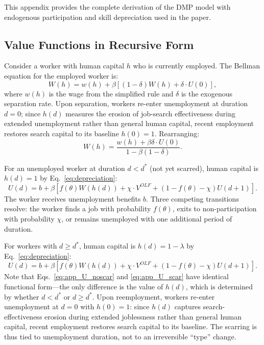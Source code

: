 \documentclass[12pt]{article}
\begin{document}
This appendix provides the complete derivation of the DMP model with endogenous participation and skill depreciation used in the paper.

\subsection{Value Functions in Recursive Form}

Consider a worker with human capital $h$ who is currently employed. The Bellman equation for the employed worker is:
\begin{equation}
W(h) = w(h) + \beta \left[ (1 - \delta) W(h) + \delta \cdot U(0) \right],
\label{eq:app_W}
\end{equation}
where $w(h)$ is the wage from the simplified rule and $\delta$ is the exogenous separation rate. Upon separation, workers re-enter unemployment at duration $d = 0$; since $h(d)$ measures the erosion of job-search effectiveness during extended unemployment rather than general human capital, recent employment restores search capital to its baseline $h(0) = 1$. Rearranging:
\begin{equation}
W(h) = \frac{w(h) + \beta \delta \cdot U(0)}{1 - \beta(1 - \delta)}.
\label{eq:app_W_solved}
\end{equation}

For an unemployed worker at duration $d < d^*$ (not yet scarred), human capital is $h(d) = 1$ by Eq.~\ref{eq:depreciation}:
\begin{equation}
U(d) = b + \beta \left[ f(\theta) W(h(d)) + \chi \cdot V^{OLF} + (1 - f(\theta) - \chi) U(d+1) \right].
\label{eq:app_U_noscar}
\end{equation}
The worker receives unemployment benefits $b$. Three competing transitions resolve: the worker finds a job with probability $f(\theta)$, exits to non-participation with probability $\chi$, or remains unemployed with one additional period of duration.

For workers with $d \geq d^*$, human capital is $h(d) = 1 - \lambda$ by Eq.~\ref{eq:depreciation}:
\begin{equation}
U(d) = b + \beta \left[ f(\theta) W(h(d)) + \chi \cdot V^{OLF} + (1 - f(\theta) - \chi) U(d+1) \right].
\label{eq:app_U_scar}
\end{equation}
Note that Eqs.~\ref{eq:app_U_noscar} and \ref{eq:app_U_scar} have identical functional form---the only difference is the value of $h(d)$, which is determined by whether $d < d^*$ or $d \geq d^*$. Upon reemployment, workers re-enter unemployment at $d = 0$ with $h(0) = 1$: since $h(d)$ captures search-effectiveness erosion during extended joblessness rather than general human capital, recent employment restores search capital to its baseline. The scarring is thus tied to unemployment duration, not to an irreversible ``type'' change.
\end{document}
